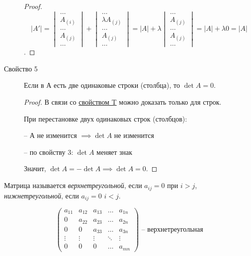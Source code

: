 \begin{description}
\begin{proof}
        \begin{equation*}
            |A'| = \begin{vmatrix}
                \dots \\ A_{(i)} \\ \dots \\ A_{(j)} \\ \dots
            \end{vmatrix} + \begin{vmatrix}
                \dots \\ \lambda A_{(j)} \\ \dots \\ A_{(j)} \\ \dots
            \end{vmatrix} = |A| + \lambda \begin{vmatrix}
                \dots \\ A_{(j)} \\ \dots \\ A_{(j)} \\ \dots
            \end{vmatrix} = |A| + \lambda 0 = |A|
        \end{equation*}.
    \end{proof}

\item[Свойство 5\label{det:prop_5}]
    Если в А есть две одинаковые строки (столбца), то $\det A = 0$.
    \begin{proof}
        В связи со \hyperref[det:prop_t]{свойством T} можно доказать только для строк.

        При перестановке двух одинаковых строк (столбцов):

        -- А не изменится $\implies \det A$ не изменится

        -- по свойству 3: $\det A$ меняет знак

        Значит, $\det A = -\det A \implies \det A = 0$.
    \end{proof}
\end{description}

\begin{definition}
    Матрица называется \textit{верхнетреугольной}, если $a_{ij} = 0$ при $i > j$, \textit{нижнетреугольной}, если $a_{ij} = 0$ $i < j$.
\end{definition}
\begin{equation*}
    \begin{pmatrix}
        a_{11} & a_{12} & a_{13} & \dots & a_{1n} \\
        0 & a_{22} & a_{23} & \dots & a_{2n} \\
        0 & 0 & a_{33} & \dots & a_{3n} \\
        \vdots & \vdots & \vdots & \ddots & \vdots \\
        0 & 0 & 0 & \dots & a_{mn}
	\end{pmatrix} \text{ -- верхнетреугольная}
\end{equation*}

